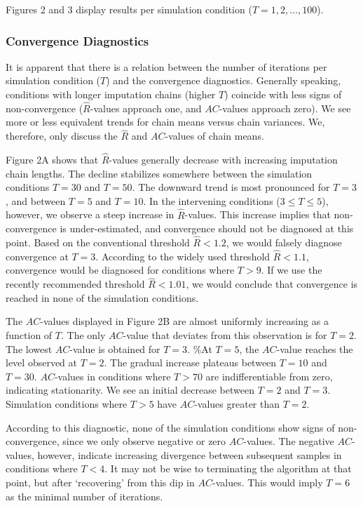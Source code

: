 \documentclass[
  Royal, times, sageapa]{sagej}
\begin{document}
Figures 2 and 3 display results per simulation condition
(\(T = 1,2,\dots,100\)).

\hypertarget{convergence-diagnostics-1}{%
\subsubsection{Convergence
Diagnostics}\label{convergence-diagnostics-1}}

It is apparent that there is a relation between the number of iterations
per simulation condition (\(T\)) and the convergence diagnostics.
Generally speaking, conditions with longer imputation chains (higher
\(T\)) coincide with less signs of non-convergence
(\(\widehat{R}\)-values approach one, and \(AC\)-values approach zero).
We see more or less equivalent trends for chain means versus chain
variances. We, therefore, only discuss the \(\widehat{R}\) and
\(AC\)-values of chain means.

Figure 2A shows that \(\widehat{R}\)-values generally decrease with
increasing imputation chain lengths. The decline stabilizes somewhere
between the simulation conditions \(T=30\) and \(T=50\). The downward
trend is most pronounced for \(T=3\), and between \(T = 5\) and
\(T = 10\). In the intervening conditions (\(3 \leq T \leq 5\)),
however, we observe a steep increase in \(\widehat{R}\)-values. This
increase implies that non-convergence is under-estimated, and
convergence should not be diagnosed at this point. Based on the
conventional threshold \(\widehat{R} < 1.2\), we would falsely diagnose
convergence at \(T=3\). According to the widely used threshold
\(\widehat{R} < 1.1\), convergence would be diagnosed for conditions
where \(T>9\). If we use the recently recommended threshold
\(\widehat{R} < 1.01\), we would conclude that convergence is reached in
none of the simulation conditions.

The \(AC\)-values displayed in Figure 2B are almost uniformly increasing
as a function of \(T\). The only \(AC\)-value that deviates from this
observation is for \(T=2\). The lowest \(AC\)-value is obtained for
\(T=3\). \%At \(T=5\), the \(AC\)-value reaches the level observed at
\(T=2\). The gradual increase plateaus between \(T=10\) and \(T=30\).
\(AC\)-values in conditions where \(T>70\) are indifferentiable from
zero, indicating stationarity. We see an initial decrease between
\(T=2\) and \(T=3\). Simulation conditions where \(T>5\) have
\(AC\)-values greater than \(T=2\).

According to this diagnostic, none of the simulation conditions show
signs of non-convergence, since we only observe negative or zero
\(AC\)-values. The negative \(AC\)-values, however, indicate increasing
divergence between subsequent samples in conditions where \(T<4\). It
may not be wise to terminating the algorithm at that point, but after
`recovering' from this dip in \(AC\)-values. This would imply \(T=6\) as
the minimal number of iterations.
\end{document}
